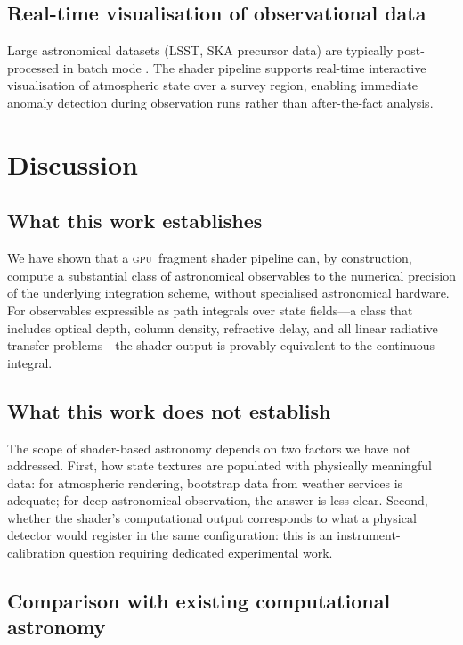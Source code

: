 \documentclass[11pt,twocolumn,a4paper]{article}
\theoremstyle{definition}
\theoremstyle{remark}
\newcommand{\gpu}{\textsc{gpu}}
\begin{document}
\subsection{Real-time visualisation of observational data}

Large astronomical datasets (LSST, SKA precursor data) are typically post-processed in batch mode \citep{bosch2018}. The shader pipeline supports real-time interactive visualisation of atmospheric state over a survey region, enabling immediate anomaly detection during observation runs rather than after-the-fact analysis.

\section{Discussion}
\label{sec:discussion}

\subsection{What this work establishes}

We have shown that a \gpu\ fragment shader pipeline can, by construction, compute a substantial class of astronomical observables to the numerical precision of the underlying integration scheme, without specialised astronomical hardware. For observables expressible as path integrals over state fields---a class that includes optical depth, column density, refractive delay, and all linear radiative transfer problems---the shader output is provably equivalent to the continuous integral.

\subsection{What this work does not establish}

The scope of shader-based astronomy depends on two factors we have not addressed. First, how state textures are populated with physically meaningful data: for atmospheric rendering, bootstrap data from weather services is adequate; for deep astronomical observation, the answer is less clear. Second, whether the shader's computational output corresponds to what a physical detector would register in the same configuration: this is an instrument-calibration question requiring dedicated experimental work.

\subsection{Comparison with existing computational astronomy}
\end{document}
